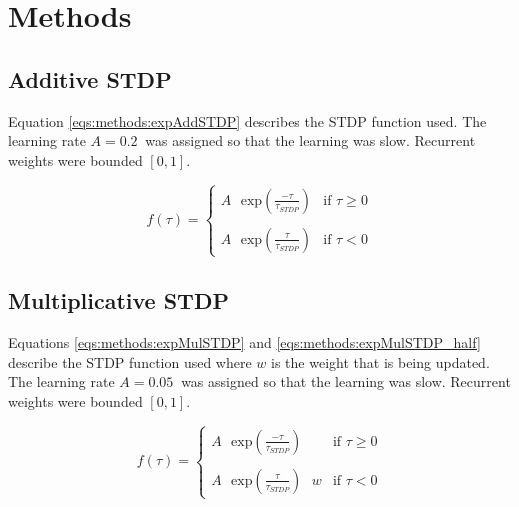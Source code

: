 \documentclass[utf8]{frontiers_suppmat} %
\begin{document}
\onecolumn
{}

\title[Supplementary Material]{{}}


\maketitle


\section{Methods}

\subsection{Additive STDP}
Equation \ref{eqs:methods:expAddSTDP} describes the STDP function used. The learning rate $A=\SI{0.2}{}$ was assigned so that the learning was slow. Recurrent weights were bounded $[0, 1]$.

\begin{equation}
    f(\tau) = 	\begin{cases}
                    A\text{ } \mathrm{exp} \left (%
                    \frac{-\tau}{\tau_{STDP}} \right ) & \mbox{if } \tau \geq 0 \\ \\
                    A\text{ } \mathrm{exp} \left (%
                    \frac{\tau}{\tau_{STDP}} \right ) & \mbox{if } \tau < 0
                \end{cases}
    \label{eqs:methods:expAddSTDP}
\end{equation}

\subsection{Multiplicative STDP}
Equations \ref{eqs:methods:expMulSTDP} and \ref{eqs:methods:expMulSTDP_half} describe the STDP function used where $w$ is the weight that is being updated. The learning rate $A=\SI{0.05}{}$ was assigned so that the learning was slow. Recurrent weights were bounded $[0, 1]$.

\begin{equation}
    f(\tau) = 	\begin{cases}
                    A\text{ } \mathrm{exp} \left (%
                    \frac{-\tau}{\tau_{STDP}} \right ) & \mbox{if } \tau \geq 0 \\ \\
                    A\text{ } \mathrm{exp} \left (%
                    \frac{\tau}{\tau_{STDP}} \right ) \text{ } w & \mbox{if } \tau < 0
                \end{cases}
    \label{eqs:methods:expMulSTDP}
\end{equation}
\end{document}
